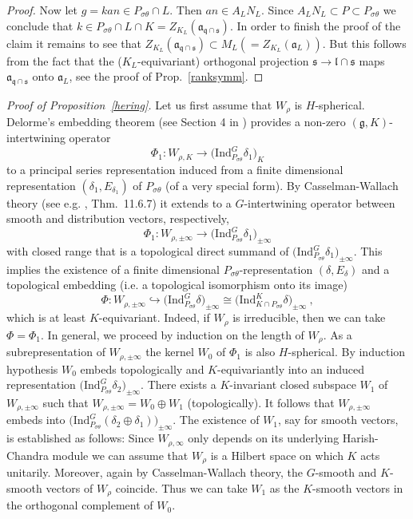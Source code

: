 \documentclass[10]{amsart}
\theoremstyle{remark}
\theoremstyle{definition}
\numberwithin{equation}{section}
\newcommand{\fa}{{\mathfrak a}}             %
\newcommand{\fg}{{\mathfrak g}}
\newcommand{\fl}{{\mathfrak l}}
\newcommand{\fq}{{\mathfrak q}}
\newcommand{\fs}{{\mathfrak s}}
\newcommand{\gt}{\theta}
\newcommand{\beu}{\begin{equation*}}
\begin{document}
{\begin{proof}
Now let $g=kan\in P_{\sigma\gt}\cap L$. Then $an\in A_LN_L$. Since $A_LN_L\subset P\subset P_{\sigma\gt}$ we conclude that $k\in P_{\sigma\gt}\cap L\cap K= Z_{K_L}(\fa_{\fq\cap\fs})$. In order to finish the proof of the claim it remains to see that $Z_{K_L}({\mathfrak a}_{{\mathfrak q}\cap{\mathfrak s}})\subset M_L(=Z_{K_L}({\mathfrak a}_L))$.
But this follows from the fact that the ($K_L$-equivariant) orthogonal projection $\fs\rightarrow\fl\cap\fs$ maps $\fa_{\fq\cap\fs}$ onto $\fa_L$, see the proof of Prop.~\ref{ranksymm}.
\end{proof}
{\it Proof of Proposition~\ref{hering}.} Let us first assume that $W_\rho$ is $H$-spherical. Delorme's embedding theorem (see Section 4 in \cite{Del85}) provides a non-zero 
$(\fg,K)$-intertwining operator
%
\beu
\Phi_1: W_{\rho,K}\longrightarrow\big(\text{Ind}_{P_{\sigma\gt}}^{G}\delta_1\big)_{K}
\end{equation*}
%
to a principal series representation induced from a finite dimensional representation $(\delta_1,E_{\delta_1})$ of $P_{\sigma\gt}$ (of a very special form). By Casselman-Wallach
theory (see e.g. \cite{Wa92}, Thm.~11.6.7)  it extends to a $G$-intertwining operator  between smooth and distribution vectors, respectively,
\beu
\Phi_1: W_{\rho,\pm\infty}\longrightarrow\big(\text{Ind}_{P_{\sigma\gt}}^{G}\delta_1\big)_{\pm\infty}
\end{equation*}
with closed range that  is a topological direct summand of $\big(\text{Ind}_{P_{\sigma\gt}}^{G}\delta_1\big)_{\pm\infty}$.
This implies the existence of a finite dimensional $P_{\sigma\gt}$-representation  $(\delta,E_{\delta})$ and a topological  embedding (i.e. a topological isomorphism onto its image)
\beu
\Phi: W_{\rho,\pm\infty}\hookrightarrow\big(\text{Ind}_{P_{\sigma\gt}}^{G}\delta\big)_{\pm\infty}\cong\big(\text{Ind}_{K\cap P_{\sigma\gt}}^{K}\delta\big)_{\pm\infty}\ ,
\end{equation*}
which is at least $K$-equivariant. Indeed, if $W_\rho$ is irreducible, then we can take $\Phi=\Phi_1$. In general, we proceed by induction on the length of $W_\rho$. As a subrepresentation
of $W_{\rho,\pm\infty}$ the kernel $W_0$ of $\Phi_1$ is also $H$-spherical. By induction hypothesis $W_0$ embeds topologically and $K$-equivariantly into an induced representation $\big(\text{Ind}_{P_{\sigma\gt}}^{G}\delta_2\big)_{\pm\infty}$. There exists a $K$-invariant closed subspace $W_1$ of $W_{\rho,\pm\infty}$ such that $W_{\rho,\pm\infty}=W_0\oplus W_1$ (topologically).
It follows that $W_{\rho,\pm\infty}$ embeds into $\big(\text{Ind}_{P_{\sigma\gt}}^{G}(\delta_2\oplus\delta_1)\big)_{\pm\infty}$. The existence of $W_1$, say for smooth vectors,  is established as follows: Since $W_{\rho,\infty}$
only depends on its underlying Harish-Chandra module we can assume that $W_\rho$ is a Hilbert space on which $K$ acts unitarily. Moreover, again by Casselman-Wallach theory,
the $G$-smooth and $K$-smooth vectors of $W_\rho$ coincide. Thus we can take $W_1$ as the $K$-smooth vectors in the orthogonal complement of $W_0$.

}
\end{document}
